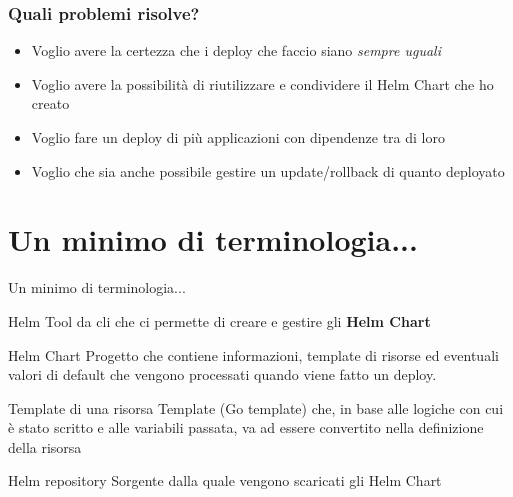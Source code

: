 \documentclass{beamer}
\begin{document}
 \begin{frame}
 \frametitle{Quali problemi risolve?}
 \begin{itemize}
     \item Voglio avere la certezza che i deploy che faccio siano \textit{sempre uguali}
     \item Voglio avere la possibilità di riutilizzare e condividere il  Helm Chart che ho creato
     \item Voglio fare un deploy di più applicazioni con dipendenze tra di loro
     \item Voglio che sia anche possibile gestire un update/rollback di quanto deployato
 \end{itemize}
 \end{frame}
 
\section{Un minimo di terminologia...} 
 \begin{frame}[allowframebreaks]{Un minimo di terminologia...}
 
 \begin{block}{Helm}
 Tool da cli che ci permette di creare e gestire gli \textbf{Helm Chart}
 \end{block}
 \framebreak
 \begin{block}{Helm Chart}
 Progetto che contiene informazioni, template di risorse ed eventuali valori di default che vengono processati quando viene fatto un deploy.
 \end{block}
 \framebreak
 \begin{block}{Template di una risorsa}
 Template (Go template) che, in base alle logiche con cui è stato scritto e alle variabili passata, va ad essere convertito nella definizione della risorsa
 \end{block}
 \framebreak
 \begin{block}{Helm repository}
 Sorgente dalla quale vengono scaricati gli Helm Chart
 \end{block}
 \end{frame}
 
\end{document}
